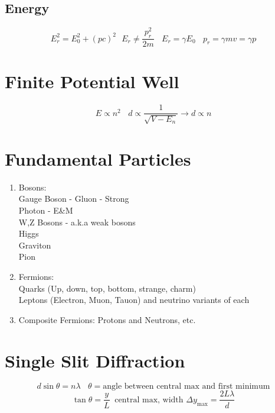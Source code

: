 \documentclass[10pt,letter]{article}
\begin{document}
\subsection{Energy} %
\label{sub:energy}
\begin{equation}
    E_r^2 = E_0^2 + (pc)^2~~~E_r \neq \frac{p_r^2}{2m} ~~~~ E_r = \gamma E_0~~~~ p_r = \gamma mv = \gamma p
\end{equation}

\section{Finite Potential Well} %
\label{sec:finite_potential_well}
\begin{equation}
    E \propto n^2 ~~~~ d \propto \frac{1}{\sqrt{V-E_n}} \rightarrow d \propto n
\end{equation}

\section{Fundamental Particles} %
\label{sec:fundamental_particles}
\begin{enumerate}
    \item Bosons:\\
    Gauge Boson - Gluon - Strong\\
    Photon - E\&M\\
    W,Z Bosons - a.k.a weak bosons\\
    Higgs\\
    Graviton\\
    Pion
    \item Fermions:\\
    Quarks (Up, down, top, bottom, strange, charm)\\
    Leptons (Electron, Muon, Tauon) and neutrino variants of each
    \item Composite Fermions: Protons and Neutrons, etc.
\end{enumerate}

\section{Single Slit Diffraction} %
\label{sec:single_slit_diffraction}
\begin{equation}
    d\sin \theta = n\lambda ~~~~ \theta = \textrm{angle between central max and first minimum}
\end{equation}
\begin{equation}
    \tan \theta = \frac{y}{L} ~ \textrm{    central max, width  } \Delta y_{\textrm{max}} = \frac{2 L \lambda}{d}
\end{equation}
\end{document}
